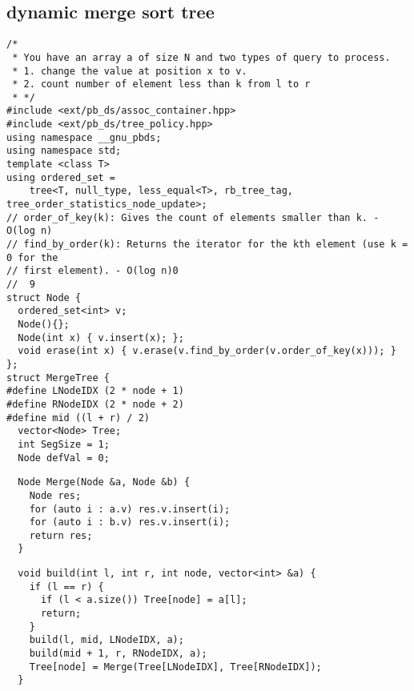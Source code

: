 \documentclass[twoside]{article}
\begin{document}
\begin{multicols*}{2}
\begin{verbatim}
\end{verbatim}

{
\subsection*{dynamic merge sort tree}
}
\begin{verbatim}
/*
 * You have an array a of size N and two types of query to process.
 * 1. change the value at position x to v.
 * 2. count number of element less than k from l to r
 * */
#include <ext/pb_ds/assoc_container.hpp>
#include <ext/pb_ds/tree_policy.hpp>
using namespace __gnu_pbds;
using namespace std;
template <class T>
using ordered_set =
    tree<T, null_type, less_equal<T>, rb_tree_tag, tree_order_statistics_node_update>;
// order_of_key(k): Gives the count of elements smaller than k. - O(log n)
// find_by_order(k): Returns the iterator for the kth element (use k = 0 for the
// first element). - O(log n)0
//  9
struct Node {
  ordered_set<int> v;
  Node(){};
  Node(int x) { v.insert(x); };
  void erase(int x) { v.erase(v.find_by_order(v.order_of_key(x))); }
};
struct MergeTree {
#define LNodeIDX (2 * node + 1)
#define RNodeIDX (2 * node + 2)
#define mid ((l + r) / 2)
  vector<Node> Tree;
  int SegSize = 1;
  Node defVal = 0;
\end{verbatim}
\vspace{-12pt}
\begin{verbatim}
  Node Merge(Node &a, Node &b) {
    Node res;
    for (auto i : a.v) res.v.insert(i);
    for (auto i : b.v) res.v.insert(i);
    return res;
  }
\end{verbatim}
\vspace{-12pt}
\begin{verbatim}
  void build(int l, int r, int node, vector<int> &a) {
    if (l == r) {
      if (l < a.size()) Tree[node] = a[l];
      return;
    }
    build(l, mid, LNodeIDX, a);
    build(mid + 1, r, RNodeIDX, a);
    Tree[node] = Merge(Tree[LNodeIDX], Tree[RNodeIDX]);
  }
\end{verbatim}
\vspace{-12pt}
\begin{verbatim}

\end{verbatim}
\end{multicols*}
\end{document}
